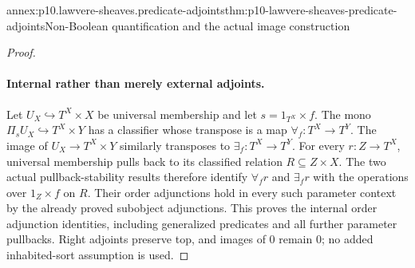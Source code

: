 \begin{annexitem}{annex:p10.lawvere-sheaves.predicate-adjoints}{thm:p10-lawvere-sheaves-predicate-adjoints}{Non-Boolean quantification and the actual image construction}
\begin{proof}
\paragraph{Internal rather than merely external adjoints.}
Let \(U_X\hookrightarrow T^X\times X\) be universal
membership and let \(s=1_{T^X}\times f\).  The mono
\(\Pi_sU_X\hookrightarrow T^X\times Y\) has a
classifier whose transpose is a map
\(\forall_f:T^X\to T^Y\).  The image of
\(U_X\to T^X\times Y\) similarly transposes to
\(\exists_f:T^X\to T^Y\).
For every \(r:Z\to T^X\), universal membership pulls
back to its classified relation \(R\subseteq Z\times X\).
The two actual pullback-stability results therefore identify
\(\forall_fr\) and \(\exists_fr\) with the operations
over \(1_Z\times f\) on \(R\).  Their order adjunctions
hold in every such parameter context by the already proved
subobject adjunctions.  This proves the internal order
adjunction identities, including generalized predicates and
all further parameter pullbacks.
Right adjoints preserve top, and images of \(0\) remain
\(0\); no added inhabited-sort assumption is used.
\end{proof}
\end{annexitem}


